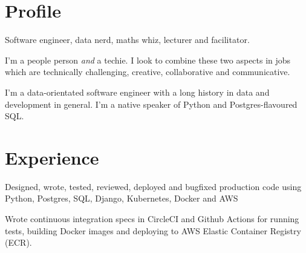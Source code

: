 \documentclass[a4paper,nomath]{deedy-resume} %
\begin{document}

\lastupdated %


%
\begin{paracol}{2} %


    \section{Profile}
    \flushleft
    Software engineer, data nerd, maths whiz, lecturer and facilitator.

    \vspace{\topsep}

    I'm a people person \textit{and} a techie. I look to combine these two
    aspects in jobs which are technically challenging, creative, collaborative
    and communicative.

    \vspace{\topsep}

    I'm a data-orientated software engineer with a long history in data and
    development in general.
    I'm a native speaker of Python and Postgres-flavoured SQL.
    

    \section{Experience}

    
    \vspace{\topsep} %
    \begin{tightitemize}
      \item Designed, wrote, tested, reviewed, deployed and bugfixed production code using Python, Postgres, SQL, Django, Kubernetes, Docker and AWS
       \\ 
     \item Wrote continuous integration specs in CircleCI and Github Actions for running tests, building Docker images and deploying to AWS Elastic Container Registry (ECR).


\end{tightitemize}
\end{paracol}
\end{document}
